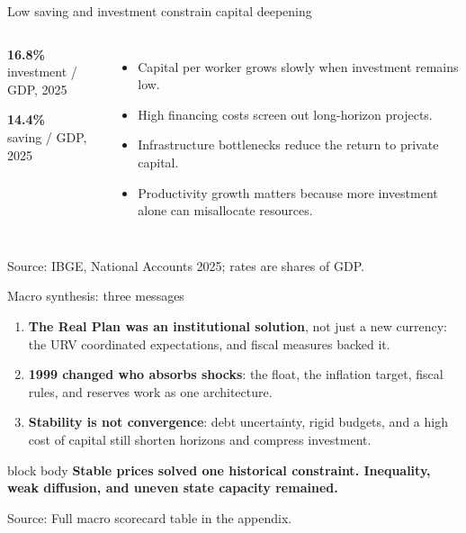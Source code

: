 \documentclass[10pt,aspectratio=169]{beamer}
\newcommand{\source}[1]{%
  \par\vfill{\tiny\color{MidGray}Source: #1}}
\newcommand{\key}[1]{\textcolor{BrazilGreen}{\textbf{#1}}}
\newcommand{\warn}[1]{\textcolor{Brick}{\textbf{#1}}}
\newcommand{\muted}[1]{\textcolor{MidGray}{#1}}
\newcommand{\question}[1]{%
  \begin{beamercolorbox}[rounded=true,sep=0.55em,wd=\textwidth]{block body}
    \centering\large\textbf{#1}
  \end{beamercolorbox}}
\begin{document}
\begin{frame}{Low saving and investment constrain capital deepening}
  \begin{columns}[T,onlytextwidth]
      \begin{center}
        {\fontsize{34}{38}\selectfont\color{DeepNavy}\textbf{16.8\%}}\\[-.1cm]
        \muted{investment / GDP, 2025}
        \vspace{.7cm}

        {\fontsize{34}{38}\selectfont\color{BrazilGreen}\textbf{14.4\%}}\\[-.1cm]
        \muted{saving / GDP, 2025}
      \end{center}
      \begin{itemize}
        \item Capital per worker grows slowly when investment remains low.
        \item High financing costs screen out long-horizon projects.
        \item Infrastructure bottlenecks reduce the return to private capital.
        \item Productivity growth matters because more investment alone can misallocate resources.
      \end{itemize}
  \end{columns}
  \source{IBGE, National Accounts 2025; rates are shares of GDP.}
\end{frame}

\begin{frame}{Macro synthesis: three messages}
  \begin{enumerate}
    \setlength\itemsep{.35cm}
    \item \key{The Real Plan was an institutional solution}, not just a new currency: the URV coordinated expectations, and fiscal measures backed it.
    \item \key{1999 changed who absorbs shocks}: the float, the inflation target, fiscal rules, and reserves work as one architecture.
    \item \warn{Stability is not convergence}: debt uncertainty, rigid budgets, and a high cost of capital still shorten horizons and compress investment.
  \end{enumerate}
  \vspace{.4cm}
  \question{Stable prices solved one historical constraint. Inequality, weak diffusion, and uneven state capacity remained.}
  \source{Full macro scorecard table in the appendix.}
\end{frame}
\end{document}
